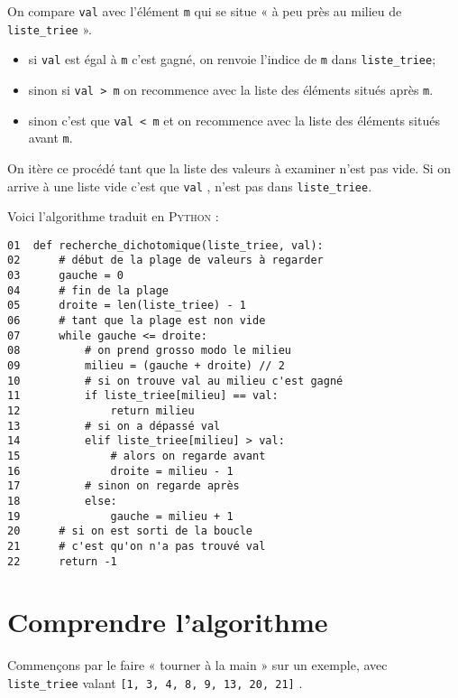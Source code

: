 \begin{methode}[]
	On compare \texttt{val} avec l'élément \texttt{m} qui se situe « à peu près au milieu de \texttt{liste_triee} ».
	\begin{itemize}
		\item 	si \texttt{val} est égal à \texttt{m} c'est gagné, on renvoie l'indice de \texttt{m} dans  \texttt{liste_triee};
		\item 	sinon si \texttt{val > m} on recommence avec la liste des éléments situés après \texttt{m}.
		\item 	sinon c'est que \texttt{val < m} et on recommence avec la liste des éléments situés avant \texttt{m}.
	\end{itemize}
	On itère ce procédé tant que la liste des valeurs à examiner n'est pas vide. Si on arrive à une liste vide c'est que \texttt{val} , n'est pas dans \texttt{liste_triee}.
\end{methode}
Voici l'algorithme traduit en \textsc{Python} :
\begin{pyc}
			\begin{verbatim}
01	def recherche_dichotomique(liste_triee, val):
02		# début de la plage de valeurs à regarder
03		gauche = 0  
04		# fin de la plage
05		droite = len(liste_triee) - 1
06		# tant que la plage est non vide  
07		while gauche <= droite:  
08			# on prend grosso modo le milieu
09			milieu = (gauche + droite) // 2  
10			# si on trouve val au milieu c'est gagné
11			if liste_triee[milieu] == val:
12				return milieu  
13			# si on a dépassé val
14			elif liste_triee[milieu] > val:  
15				# alors on regarde avant
16				droite = milieu - 1  
17			# sinon on regarde après
18			else:
19				gauche = milieu + 1  
20		# si on est sorti de la boucle
21		# c'est qu'on n'a pas trouvé val
22		return -1  
	\end{verbatim}
\end{pyc}

\section{Comprendre l'algorithme}

Commençons par le faire « tourner à la main » sur un exemple, avec\\ \texttt{liste_triee} valant \texttt{[1, 3, 4, 8, 9, 13, 20, 21]} .\\

